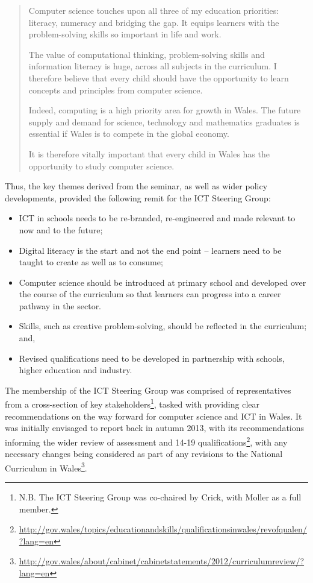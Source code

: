 \documentclass{sig-alternate}
\begin{document}
\begin{quotation}
Computer science touches upon all three of my education priorities:
literacy, numeracy and bridging the gap. It equips learners with the
problem-solving skills so important in life and work.

The value of computational thinking, problem-solving skills and
information literacy is huge, across all subjects in the curriculum. I
therefore believe that every child should have the opportunity to
learn concepts and principles from computer science.

Indeed, computing is a high priority area for growth in Wales. The
future supply and demand for science, technology and mathematics
graduates is essential if Wales is to compete in the global economy.

It is therefore vitally important that every child in Wales has the
opportunity to study computer science.
\end{quotation}

Thus, the key themes derived from the seminar, as well as wider policy
developments, provided the following remit for the ICT Steering Group:

\begin{itemize}
\item ICT in schools needs to be re-branded, re-engineered and made
relevant to now and to the future;
\item Digital literacy is the start and not the end point -- learners
need to be taught to create as well as to consume;
\item Computer science should be introduced at primary school and
developed over the course of the curriculum so that learners can
progress into a career pathway in the sector.
\item Skills, such as creative problem-solving, should be reflected in
the curriculum; and,
\item Revised qualifications need to be developed in partnership with
schools, higher education and industry.
\end{itemize}

The membership of the ICT Steering Group was comprised of
representatives from a cross-section of key
stakeholders\footnote{N.B. The ICT Steering Group was co-chaired by
Crick, with Moller as a full member.}, tasked with providing clear
recommendations on the way forward for computer science and ICT in
Wales. It was initially envisaged to report back in autumn 2013, with
its recommendations informing the wider review of assessment and 14-19
qualifications\footnote{\url{http://gov.wales/topics/educationandskills/qualificationsinwales/revofqualen/?lang=en}},
with any necessary changes being considered as part of any revisions
to the National Curriculum in
Wales\footnote{\url{http://gov.wales/about/cabinet/cabinetstatements/2012/curriculumreview/?lang=en}}.
\end{document}
